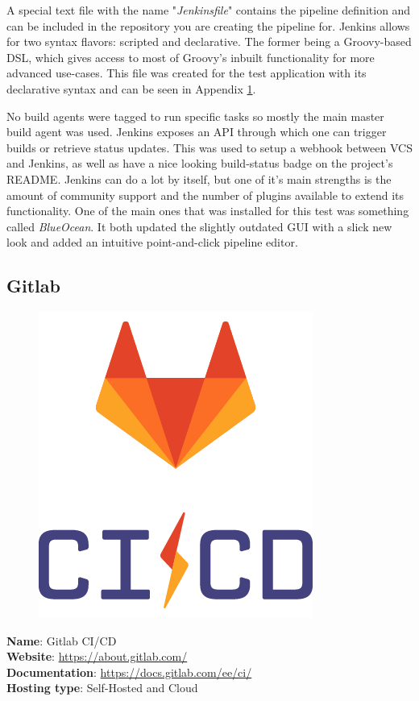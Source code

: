 A special text file with the name "\textit{Jenkinsfile}" contains the pipeline definition and can be included in the repository you are creating the pipeline for. Jenkins allows for two syntax flavors: scripted and declarative.\cite{jenkins-dsl, jenkins-declarative} The former being a Groovy-based DSL, which gives access to most of Groovy's inbuilt functionality for more advanced use-cases.
This file was created for the test application with its declarative syntax and can be seen in Appendix \hyperref[chapter:appendix-travis]{1}.

\pagebreak

No build agents were tagged to run specific tasks so mostly the main master build agent was used. Jenkins exposes an API through which one can trigger builds or retrieve status updates. This was used to setup a webhook between VCS and Jenkins, as well as have a nice looking build-status badge on the project's README. Jenkins can do a lot by itself, but one of it's main strengths is the amount of community support and the number of plugins available to extend its functionality. One of the main ones that was installed for this test was something called \textit{BlueOcean}. It both updated the slightly outdated GUI with a slick new look and added an intuitive point-and-click pipeline editor.


\subsection{Gitlab}
\begin{figure}
    \vspace{-50pt}
    \includegraphics[width=.25\textwidth]{figures/brand/gitlab-ci-cd-logo_2x.png}  
    \vspace{-30pt}
\end{figure}
\textbf{Name}: Gitlab CI/CD \\
\textbf{Website}: \url{https://about.gitlab.com/}\\
\textbf{Documentation}: \url{https://docs.gitlab.com/ee/ci/}\\
\textbf{Hosting type}: Self-Hosted and Cloud

